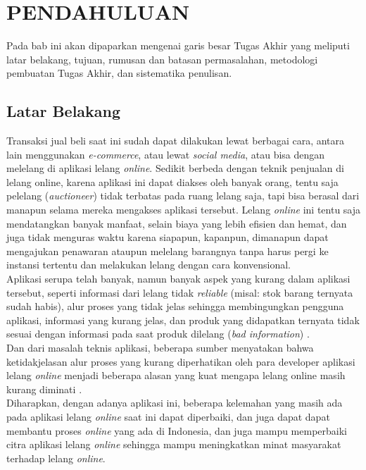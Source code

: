 \chapter{PENDAHULUAN}
  Pada bab ini akan dipaparkan mengenai garis besar Tugas Akhir yang meliputi latar belakang, tujuan, rumusan dan batasan permasalahan, metodologi pembuatan Tugas Akhir, dan sistematika penulisan.
  
  \section{Latar Belakang}	
	\indent Transaksi jual beli saat ini sudah dapat dilakukan lewat berbagai cara, antara lain menggunakan \textit{e-commerce}, atau lewat \textit{social media}, atau bisa dengan melelang di aplikasi lelang \textit{online}. Sedikit berbeda dengan teknik penjualan di lelang online, karena aplikasi ini dapat diakses oleh banyak orang, tentu saja pelelang (\textit{auctioneer}) tidak terbatas pada ruang lelang saja, tapi bisa berasal dari manapun selama mereka mengakses aplikasi tersebut.  Lelang \textit{online} ini tentu saja mendatangkan banyak manfaat, selain biaya yang lebih efisien dan hemat, dan juga tidak menguras waktu karena siapapun, kapanpun, dimanapun dapat mengajukan penawaran ataupun melelang barangnya tanpa harus pergi ke instansi tertentu dan melakukan lelang dengan cara konvensional.
    \\
    \indent Aplikasi serupa telah banyak, namun banyak aspek yang kurang dalam aplikasi tersebut, seperti informasi dari lelang tidak \textit{reliable} (misal: stok barang ternyata sudah habis), alur proses yang tidak jelas sehingga membingungkan pengguna aplikasi, informasi yang kurang jelas, dan produk yang didapatkan ternyata tidak sesuai dengan informasi pada saat produk dilelang (\textit{bad information}) \cite{ying-feng_kuo_online_2016}.
    \\
    \indent Dan dari masalah teknis aplikasi, beberapa sumber menyatakan bahwa ketidakjelasan alur proses yang kurang diperhatikan oleh para developer aplikasi lelang \textit{online} menjadi beberapa alasan yang kuat mengapa lelang online masih kurang diminati \cite{noauthor_sistem_nodate}.
    \\
	\indent Diharapkan, dengan adanya aplikasi ini, beberapa kelemahan yang masih ada pada aplikasi lelang \textit{online} saat ini dapat diperbaiki, dan juga dapat dapat membantu proses \textit{online} yang ada di Indonesia, dan juga mampu memperbaiki citra aplikasi lelang \textit{online} sehingga mampu meningkatkan minat masyarakat terhadap lelang \textit{online}.
    
